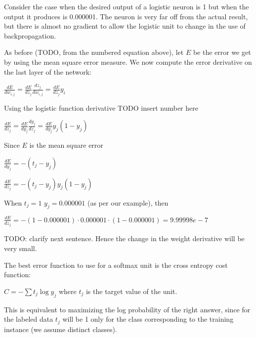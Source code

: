 \documentclass[11pt, fleqn, twoside]{article}
\begin{document}
  Consider the case when the desired output of a logistic neuron is 1 but when the output it produces is 0.000001. The neuron is very far off from the actual result, but there is almost no gradient to allow the logistic unit to change in the use of backpropagation.

  As before (TODO, from the numbered equation above), let $E$ be the error we get by using the mean square error measure.
  We now compute the error derivative on the last layer of the network:

  \begin{center}$ \frac{d E} {d {w_{i,j}}} = \frac{d E} {d {z_j}} \frac{d {z_j}} {d w_{i,j}} = \frac{d E} {d {z_j}} {y_i} $\end{center}
  Using the logistic function derivative TODO insert number here

  \begin{center}$ \frac{d E} {d z_j} = \frac{d E} {d {y_j}} \frac{d {y_j}} {d z_j} = \frac{d E} {d {y_j}} {y_j} (1 - {y_j}) $\end{center}

  Since $E$ is the mean square error
    \begin{center}$ \frac{d E}{d {y_j}}= -({t_j} - {y_j})$\end{center}

    \begin{center}$ \frac{d E} {d {z_j}} = -({t_j} - {y_j}) {y_j} (1 - {y_j})$\end{center}

    When $t_j = 1$ $y_j = 0.000001$ (as per our example), then
    \begin{center}$ \frac{d E} {d {z_j}} = - (1 -  0.000001) \cdot  0.000001  \cdot (1 -  0.000001) = 9.99998e-7 $\end{center}

    TODO: clarify next sentence.
    Hence the change in the weight derivative will be very small.



  The best error function to use for a softmax unit is the cross entropy cost function:

\begin{center} $C=- \sum{t_j \log{y_j}}$ where $t_j$ is the target value of the unit. \end{center}

  This is equivalent to maximizing the log probability of the right answer, since for the labeled data $t_j$ will be 1 only for the class corresponding to the training instance (we assume distinct classes).
\end{document}
